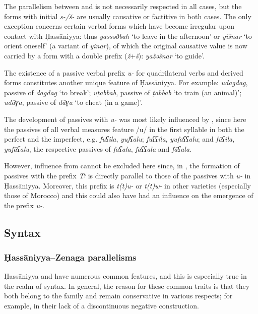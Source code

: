 \documentclass[output=paper]{langsci/langscibook}
\begin{document}
The parallelism between  and  is not necessarily respected in all cases, but the forms with initial \textit{s-/š-} are usually {causative} or factitive in both cases. The only exception concerns certain  verbal forms which have become irregular upon contact with Ḥassāniyya: thus \textit{yassəðbah} ‘to leave in the afternoon’ or \textit{yišnar} ‘to orient oneself’ (a variant of \textit{yinar}), of which the original {causative} value is now carried by a form with a double prefix (\textit{ž}+\textit{š}): \textit{yažəšnar} ‘to guide’.


The existence of a {passive} verbal prefix \textit{u-} for quadrilateral verbs and derived forms constitutes another unique feature of Ḥassāniyya. For example: \textit{udagdag}, {passive} of \textit{dagdag} ‘to break’; \textit{uṭabbab}, {passive} of \textit{ṭabbab} ‘to train (an animal)’; \textit{udāɣa}, {passive} of \textit{dāɣa} ‘to cheat (in a game)’.

The development of passives with \textit{u-} was most likely influenced by  , since here the passives of all verbal measures feature /u/ in the first syllable in both the perfect and the imperfect, e.g. \textit{fuʕila}, \textit{yu}\textit{fʕalu}; \textit{fuʕʕila}, \textit{yu}\textit{faʕʕalu}; and \textit{fūʕila}, \textit{yu}\textit{fāʕalu}, the respective passives of \textit{faʕala}, \textit{faʕʕala} and \textit{fāʕala}.

However, influence from  cannot be excluded here since, in , the {formation} of passives with the prefix \textit{Tʸ} is directly parallel to those of the passives with \textit{u-} in Ḥassāniyya. Moreover, this prefix is \textit{t(t)u-} or \textit{t(t)w-} in other  varieties (especially those of Morocco) and this could also have had an influence on the emergence of the prefix \textit{u-}. 

\subsection{Syntax} %

\subsubsection{Ḥassāniyya–Zenaga parallelisms} %

Ḥassāniyya and  have numerous common features, and this is especially true in the realm of syntax. In general, the reason for these common traits is that they both belong to the  family and remain conservative in various respects; for example, in their lack of a discontinuous negative construction.
\end{document}
